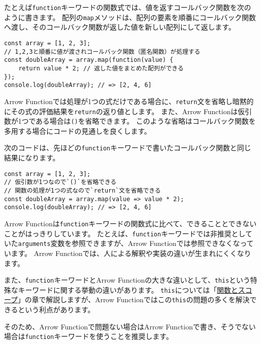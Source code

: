 たとえば\texttt{function}キーワードの関数式では、値を返すコールバック関数を次のように書きます。
配列の\texttt{map}メソッドは、配列の要素を順番にコールバック関数へ渡し、そのコールバック関数が返した値を新しい配列にして返します。

\begin{lstlisting}
const array = [1, 2, 3];
// 1,2,3と順番に値が渡されコールバック関数（匿名関数）が処理する
const doubleArray = array.map(function(value) {
    return value * 2; // 返した値をまとめた配列ができる
});
console.log(doubleArray); // => [2, 4, 6]
\end{lstlisting}

Arrow
Functionでは処理が1つの式だけである場合に、\texttt{return}文を省略し暗黙的にその式の評価結果を\texttt{return}の返り値とします。
また、Arrow
Functionは仮引数が1つである場合は\texttt{()}を省略できます。
このような省略はコールバック関数を多用する場合にコードの見通しを良くします。

次のコードは、先ほどの\texttt{function}キーワードで書いたコールバック関数と同じ結果になります。

\begin{lstlisting}
const array = [1, 2, 3];
// 仮引数が1つなので`()`を省略できる
// 関数の処理が1つの式なので`return`文を省略できる
const doubleArray = array.map(value => value * 2);
console.log(doubleArray); // => [2, 4, 6]
\end{lstlisting}

Arrow
Functionは\texttt{function}キーワードの関数式に比べて、できることとできないことがはっきりしています。
たとえば、\texttt{function}キーワードでは非推奨としていた\texttt{arguments}変数を参照できますが、Arrow
Functionでは参照できなくなっています。 Arrow
Functionでは、人による解釈や実装の違いが生まれにくくなります。

また、\texttt{function}キーワードとArrow
Functionの大きな違いとして、\texttt{this}という特殊なキーワードに関する挙動の違いがあります。
\texttt{this}については「\href{../function-scope/README.md}{関数とスコープ}」の章で解説しますが、Arrow
Functionではこの\texttt{this}の問題の多くを解決できるという利点があります。

そのため、Arrow Functionで問題ない場合はArrow
Functionで書き、そうでない場合は\texttt{function}キーワードを使うことを推奨します。

